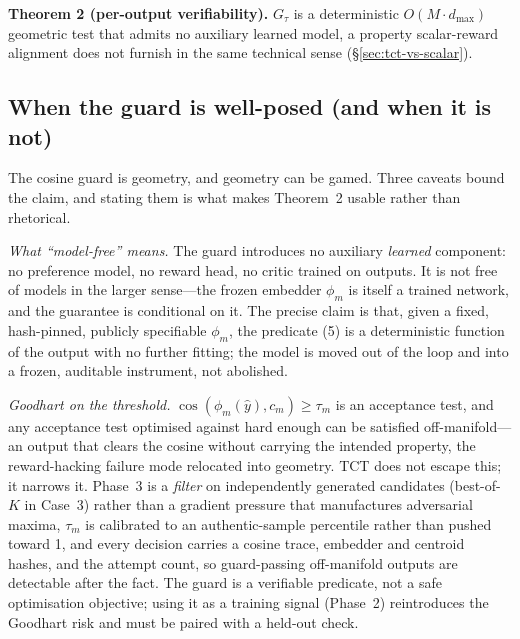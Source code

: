 \documentclass[10pt,twocolumn]{article}
\begin{document}
\textbf{Theorem 2 (per-output verifiability).} $G_\tau$ is a deterministic
$O(M\cdot d_{\max})$ geometric test that admits no auxiliary learned model, a
property scalar-reward alignment does not furnish in the same technical sense
(\S\ref{sec:tct-vs-scalar}).

\subsection{When the guard is well-posed (and when it is not)}
\label{sec:tct-honest}
The cosine guard is geometry, and geometry can be gamed. Three caveats bound the
claim, and stating them is what makes Theorem~2 usable rather than rhetorical.

\emph{What ``model-free'' means.} The guard introduces no auxiliary
\emph{learned} component: no preference model, no reward head, no critic trained
on outputs. It is not free of models in the larger sense---the frozen embedder
$\phi_m$ is itself a trained network, and the guarantee is conditional on it. The
precise claim is that, given a fixed, hash-pinned, publicly specifiable
$\phi_m$, the predicate (5) is a deterministic function of the output with no
further fitting; the model is moved out of the loop and into a frozen, auditable
instrument, not abolished.

\emph{Goodhart on the threshold.} $\cos(\phi_m(\hat y),c_m)\ge\tau_m$ is an
acceptance test, and any acceptance test optimised against hard enough can be
satisfied off-manifold---an output that clears the cosine without carrying the
intended property, the reward-hacking failure mode relocated into geometry. TCT
does not escape this; it narrows it. Phase~3 is a \emph{filter} on independently
generated candidates (best-of-$K$ in Case~3) rather than a gradient pressure that
manufactures adversarial maxima, $\tau_m$ is calibrated to an authentic-sample
percentile rather than pushed toward 1, and every decision carries a cosine
trace, embedder and centroid hashes, and the attempt count, so guard-passing
off-manifold outputs are detectable after the fact. The guard is a verifiable
predicate, not a safe optimisation objective; using it as a training signal
(Phase~2) reintroduces the Goodhart risk and must be paired with a held-out
check.
\end{document}
